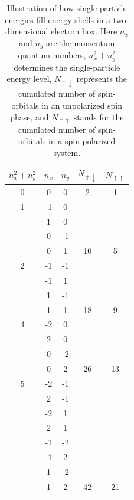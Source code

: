 \documentclass[aps,twocolumn,showpacs,floatfix,nofootinbib,preprintnumbers,superscriptaddress,amsmath,amssymb]{revtex4-1}
\begin{document}
\begin{table}
  \begin{center}
  \begin{tabular}{c|c|c|c|c}
    $n_{x}^{2}+n_{y}^{2}$ & $n_{x}$ & $n_{y}$ & 
    $N_{\uparrow \downarrow }$ & $N_{\uparrow \uparrow }$ \\
    \hline
    0 & 0 & 0 & 2 & 1 \\
    \hline
    1 & -1 &  0 & & \\
    &  1 &  0 & & \\
    &  0 & -1 & & \\
    &  0 &  1 & 10 & 5 \\
    \hline
    2  & -1 & -1 & & \\
    & -1 &  1 & & \\
    &  1 & -1 & & \\
    &  1 &  1 & 18 & 9 \\
    \hline
    4  & -2 & 0 & & \\
    &  2 & 0 & & \\
    &  0 & -2 & & \\
    &  0 &  2 & 26 & 13 \\
    \hline
    5  & -2 & -1 & & \\
    &  2 & -1 & & \\
    & -2 &  1 & & \\
    &  2 &  1 & & \\
    & -1 & -2 & & \\
    & -1 &  2 & & \\
    &  1 & -2 & & \\
    &  1 &  2 & 42 & 21 \\
    \hline
  \end{tabular}
  \end{center}
  \caption{Illustration of how single-particle energies
    fill energy shells in a two-dimensional electron box.
  Here $n_{x}$ and $n_{y}$ are the momentum quantum numbers,
  $n_{x}^{2} + n_{y}^{2}$ determines the single-particle 
  energy level, $N_{\uparrow \downarrow }$ represents the 
  cumulated number of spin-orbitals in an unpolarized spin
  phase, and $N_{\uparrow \uparrow }$ stands for the
  cumulated number of spin-orbitals in a spin-polarized
  system.} 
  \label{tab:orbitals_2dheg}
\end{table}
\end{document}
